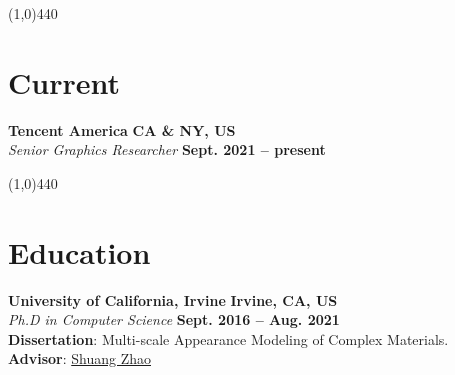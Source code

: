 \documentclass[margin,line]{resume}
\begin{document}
\begin{resume}


    
    \vspace{-5.0mm}
    \line(1,0){440}
    \vspace{-5.0mm}

    \section{\mysidestyle Current}

    \textbf{Tencent America}       \hfill \textbf{CA \& NY, US}  \\
    \textsl{Senior Graphics Researcher} 															\hfill \textbf{Sept. 2021 -- present} 

    \vspace{-5.0mm}
    \line(1,0){440}
    \vspace{-5.0mm}

    \section{\mysidestyle Education}
    \textbf{University of California, Irvine}       \hfill \textbf{Irvine, CA, US}  \\
    \textsl{Ph.D in Computer Science} 															\hfill \textbf{Sept. 2016 -- Aug. 2021} \\
    \textbf{Dissertation}: Multi-scale Appearance Modeling of Complex Materials. \\
    \textbf{Advisor}: \href{https://shuangz.com/}{Shuang Zhao} 


\end{resume}
\end{document}

